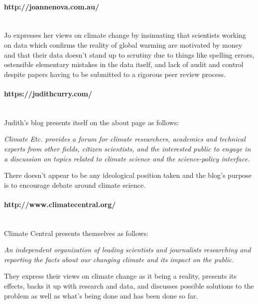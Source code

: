 \documentclass[11pt]{article}
\begin{document}
\paragraph{http://joannenova.com.au/} \hspace{0pt} \\
Jo expresses her views on climate change by insinuating that scientists working on
data which confirms the reality of global warming are motivated by money and that
their data doesn't stand up to scrutiny due to things like spelling errors,
ostensible elementary mistakes in the data itself, and lack of audit and control
despite papers having to be submitted to a rigorous peer review process.

\paragraph{https://judithcurry.com/} \hspace{0pt} \\
Judith's blog presents itself on the about page as follows:

\begin{displayquote}
\textit{Climate Etc. provides a forum for climate researchers, academics and technical experts
from other fields, citizen scientists, and the interested public to engage in a
discussion on topics related to climate science and the science-policy interface.}
\end{displayquote}

There doesn't appear to be any ideological position taken and the blog's purpose
is to encourage debate around climate science.

\paragraph{http://www.climatecentral.org/} \hspace{0pt} \\
Climate Central presents themselves as follows:

\begin{displayquote}
\textit{An independent organization of leading scientists and journalists researching and
reporting the facts about our changing climate and its impact on the public.}
\end{displayquote}

They express their views on climate change as it being a reality, presents its
effects, backs it up with research and data, and discusses possible solutions to the
problem as well as what's being done and has been done so far.
\end{document}
